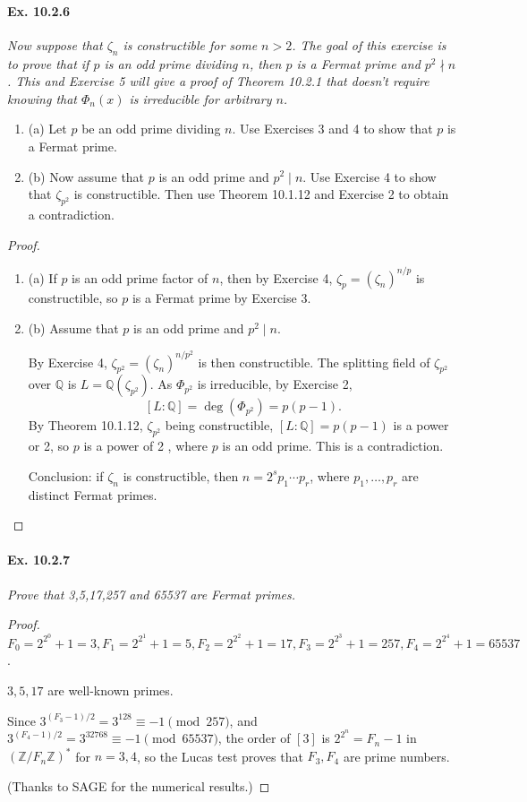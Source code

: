 \documentclass[11pt,a4paper]{article}
\newcommand{\be} {\begin{enumerate}}
\newcommand{\ee} {\end{enumerate}}
\newcommand{\Q}{\mathbb{Q}}
\newcommand{\Z}{\mathbb{Z}}
\begin{document}
\paragraph{Ex. 10.2.6}

{\it Now suppose that $\zeta_n$ is constructible for some $n>2$. The goal of this exercise is to prove that if $p$ is an odd prime dividing $n$, then $p$ is a Fermat prime and $p^2 \nmid n$. This and Exercise 5 will give a proof of Theorem 10.2.1 that doesn't require knowing that $\Phi_n(x)$ is irreducible for arbitrary $n$.
\be
\item[(a)] Let $p$ be an odd prime dividing $n$. Use Exercises 3 and 4 to show that $p$ is a Fermat prime.
\item[(b)] Now assume that $p$ is an odd prime and $p^2\mid n$. Use Exercise 4 to show that $\zeta_{p^2}$ is constructible. Then use Theorem 10.1.12 and Exercise 2 to obtain a contradiction.
\ee
}

\begin{proof}
\be
\item[(a)] If $p$ is an odd prime factor of $n$, then by Exercise 4, $\zeta_p = (\zeta_n)^{n/p}$ is constructible, so $p$ is a Fermat prime by Exercise 3.
\item[(b)]Assume that $p$ is an odd prime and $p^2\mid n$.

 By Exercise 4, $\zeta_{p ^2}= (\zeta_n)^{n/p^2}$ is then constructible. The splitting field of $\zeta_{p^2}$ over $\Q$ is $L = \Q(\zeta_{p^2})$. As $\Phi_{p^2}$ is irreducible, by Exercise 2,
 $$[L:\Q] = \deg(\Phi_{p^2}) = p(p-1).$$
 By Theorem 10.1.12, $\zeta_{p ^2}$ being constructible, $[L:\Q] = p(p-1)$ is a power or 2, so $p$ is a power of 2 , where $p$ is an odd prime. This is a contradiction.
 
 Conclusion: if $\zeta_n$ is constructible, then $n = 2^s p_1\cdots p_r$, where $p_1,\ldots,p_r$ are distinct Fermat primes.
\ee
\end{proof} 

\paragraph{Ex. 10.2.7}

{\it Prove that 3,5,17,257 and 65537 are Fermat primes.
}

\begin{proof}
$F_0 = 2^{2^0}+ 1=3, F_1= 2^{2^1}+ 1=5, F_2 = 2^{2^2}+ 1=17, F_3 = 2^{2^3}+ 1=257, F_4 = 2^{2^4}+ 1=65537$. 

$3,5,17$ are well-known primes.

Since $3^{(F_3-1)/2} = 3^{128} \equiv -1 \pmod {257}$, and $3^{(F_4-1)/2} = 3^{32768} \equiv -1 \pmod {65537}$, the order of $[3]$ is $2^{2^n} = F_{n} - 1$ in $(\Z/F_n\Z)^*$ for $n=3,4$, so the Lucas test proves that $F_3, F_4$ are prime numbers.

(Thanks to SAGE for the numerical  results.)
\end{proof}
\end{document}
